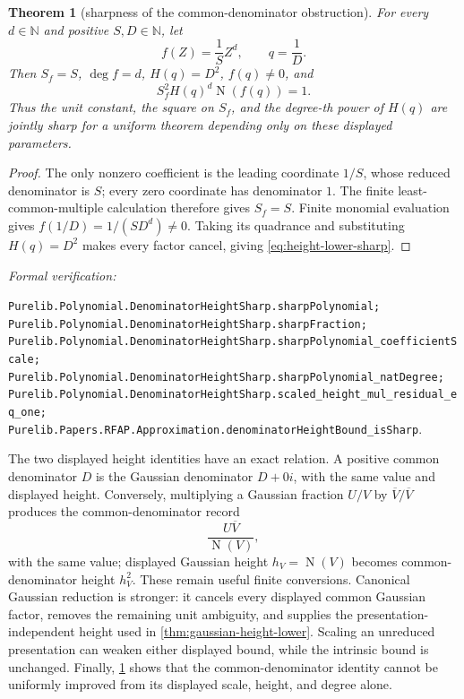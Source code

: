 \documentclass[11pt]{article}
\newtheorem{theorem}{Theorem}[section]
\newcommand{\N}{\mathbb{N}}
\newcommand{\Norm}[1]{\operatorname{N}\!\left(#1\right)}
\newcommand{\leanref}[1]{\par\smallskip\noindent
  \emph{Formal verification:}\par\nobreak
  {\raggedright\nolinkurl{#1}.\par}}
\begin{document}
\begin{theorem}[sharpness of the common-denominator obstruction]
\label{thm:height-lower-sharp}
For every $d\in\N$ and positive $S,D\in\N$, let
\[
                         f(Z)=\frac1S Z^d,
                 \qquad q=\frac1D.
\]
Then $S_f=S$, $\deg f=d$, $H(q)=D^2$, $f(q)\ne0$, and
\begin{equation}
\label{eq:height-lower-sharp}
                     S_f^2H(q)^d\Norm{f(q)}=1.
\end{equation}
Thus the unit constant, the square on $S_f$, and the degree-th power of
$H(q)$ are jointly sharp for a uniform theorem depending only on these
displayed parameters.
\end{theorem}

\begin{proof}
The only nonzero coefficient is the leading coordinate $1/S$, whose reduced
denominator is $S$; every zero coordinate has denominator $1$.  The finite
least-common-multiple calculation therefore gives $S_f=S$.
Finite monomial evaluation gives $f(1/D)=1/(SD^d)\ne0$.  Taking its
quadrance and substituting $H(q)=D^2$ makes every factor cancel, giving
\eqref{eq:height-lower-sharp}.
\end{proof}

\leanref{Purelib.Polynomial.DenominatorHeightSharp.sharpPolynomial;
Purelib.Polynomial.DenominatorHeightSharp.sharpFraction;
Purelib.Polynomial.DenominatorHeightSharp.sharpPolynomial_coefficientScale;
Purelib.Polynomial.DenominatorHeightSharp.sharpPolynomial_natDegree;
Purelib.Polynomial.DenominatorHeightSharp.scaled_height_mul_residual_eq_one;
Purelib.Papers.RFAP.Approximation.denominatorHeightBound_isSharp}

The two displayed height identities have an exact relation.  A positive
common denominator $D$ is the Gaussian denominator $D+0i$, with the same
value and displayed height.  Conversely, multiplying a Gaussian fraction
$U/V$ by $\overline V/\overline V$ produces the common-denominator record
\[
                    \frac{U\overline V}{\Norm V},
\]
with the same value; displayed Gaussian height $h_V=\Norm V$ becomes
common-denominator height $h_V^2$.  These remain useful finite conversions.
Canonical Gaussian reduction is stronger: it cancels every displayed common
Gaussian factor, removes the remaining unit ambiguity, and supplies the
presentation-independent height used in
\cref{thm:gaussian-height-lower}.  Scaling an unreduced presentation can
weaken either displayed bound, while the intrinsic bound is unchanged.
Finally, \cref{thm:height-lower-sharp} shows that the common-denominator
identity cannot be uniformly improved from its displayed scale, height, and
degree alone.
\end{document}
